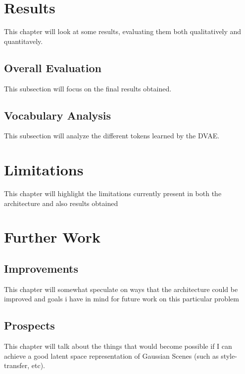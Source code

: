 \chapter{Results}
This chapter will look at some results, evaluating them both qualitatively and quantitavely. 
\section{Overall Evaluation}
This subsection will focus on the final results obtained.
\section{Vocabulary Analysis}
This subsection will analyze the different tokens learned by the DVAE.

\chapter{Limitations}
This chapter will highlight the limitations currently present in both the architecture and also results obtained

\chapter{Further Work}
\section{Improvements}
This chapter will somewhat speculate on ways that the architecture could be improved and goals i have in mind for future work on this particular problem
\section{Prospects}
This chapter will talk about the things that would become possible if I can achieve a good latent space representation of Gaussian Scenes (such as style-transfer, etc). 









